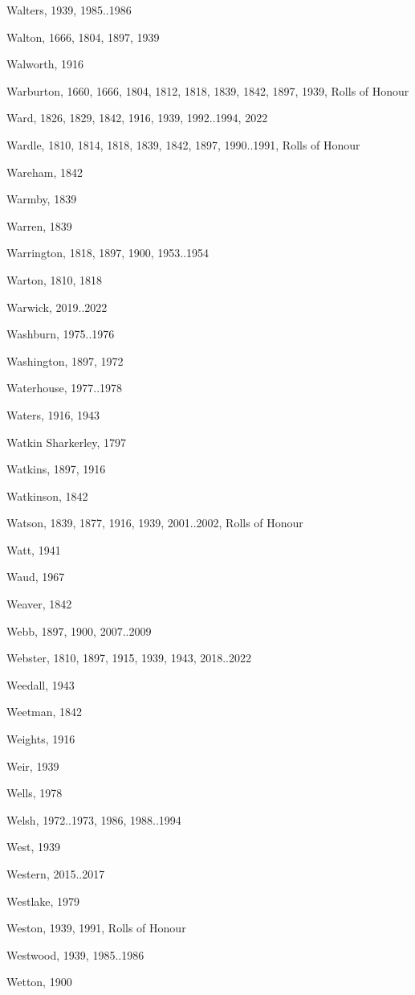 \begin{theindex}
\item Walters, 1939, 1985..1986
\item Walton, 1666, 1804, 1897, 1939
\item Walworth, 1916
\item Warburton, 1660, 1666, 1804, 1812, 1818, 1839, 1842, 1897, 1939, Rolls of Honour
\item Ward, 1826, 1829, 1842, 1916, 1939, 1992..1994, 2022
\item Wardle, 1810, 1814, 1818, 1839, 1842, 1897, 1990..1991, Rolls of Honour
\item Wareham, 1842
\item Warmby, 1839
\item Warren, 1839
\item Warrington, 1818, 1897, 1900, 1953..1954
\item Warton, 1810, 1818
\item Warwick, 2019..2022
\item Washburn, 1975..1976
\item Washington, 1897, 1972
\item Waterhouse, 1977..1978
\item Waters, 1916, 1943
\item Watkin Sharkerley, 1797
\item Watkins, 1897, 1916
\item Watkinson, 1842
\item Watson, 1839, 1877, 1916, 1939, 2001..2002, Rolls of Honour
\item Watt, 1941
\item Waud, 1967
\item Weaver, 1842
\item Webb, 1897, 1900, 2007..2009
\item Webster, 1810, 1897, 1915, 1939, 1943, 2018..2022
\item Weedall, 1943
\item Weetman, 1842
\item Weights, 1916
\item Weir, 1939
\item Wells, 1978
\item Welsh, 1972..1973, 1986, 1988..1994
\item West, 1939
\item Western, 2015..2017
\item Westlake, 1979
\item Weston, 1939, 1991, Rolls of Honour
\item Westwood, 1939, 1985..1986
\item Wetton, 1900

\end{theindex}
